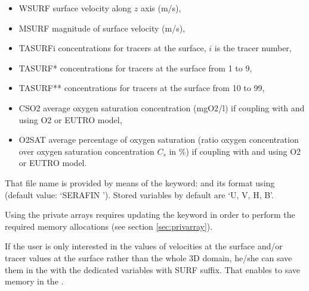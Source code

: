 \begin{itemize}
\item WSURF surface velocity along $z$ axis (m/s),

\item MSURF magnitude of surface velocity (m/s),

\item TASURFi concentrations for tracers at the surface,
$i$ is the tracer number,

\item TASURF* concentrations for tracers at the surface from 1 to 9,

\item TASURF** concentrations for tracers at the surface from 10 to 99,

\item CSO2 average oxygen saturation concentration (mgO2/l) if coupling with
\waqtel and using O2 or EUTRO model,

\item O2SAT average percentage of oxygen saturation (ratio oxygen concentration
over oxygen saturation concentration $C_s$ in \%) if coupling with \waqtel and
using O2 or EUTRO model.
\end{itemize}

That file name is provided by means of the keyword:  and
its format using  (default value: `SERAFIN ').
Stored variables by default are `U, V, H, B'.

Using the private arrays requires updating the keyword  in order to perform the required memory allocations (see
section \ref{sec:privarray}).

If the user is only interested in the values of velocities at the surface and/or
tracer values at the surface rather than the whole 3D domain,
he/she can save them in the  with the dedicated variables
with SURF suffix.
That enables to save memory in the .

